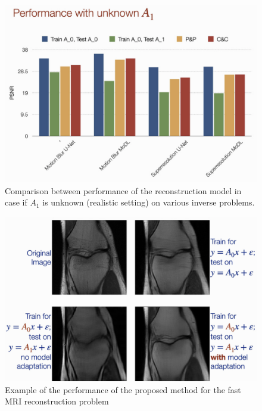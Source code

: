 \begin{figure}[h!]
    \centering
    \includegraphics[scale=0.4]{neurips-2020/images/Screenshot 2020-12-13 at 21.34.45.png}
    \caption{Comparison between performance of the reconstruction model in case if $A_1$ is unknown (realistic setting) on various inverse problems.}
    \label{fig:adaptation_results_2}
\end{figure}

\begin{figure}[h!]
    \centering
    \includegraphics[scale=0.4]{neurips-2020/images/Screenshot 2020-12-13 at 21.13.23.png}
    \caption{Example of the performance of the proposed method for the fast MRI reconstruction problem}
    \label{fig:fast_mri_recon}
\end{figure}

